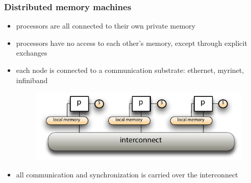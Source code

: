 \begin{frame}[fragile]
%
  \frametitle{Distributed memory machines}
%
  \begin{itemize}
%
  \item processors are all connected to their own private memory
  \item processors have no access to each other's memory, except through explicit exchanges
  \item each node is connected to a communication substrate: ethernet, myrinet, infiniband
%
  \begin{figure}
    \centering
    \includegraphics[width=.90\linewidth]{figures/distributed-memory.pdf}
    \label{fig:distributed-memory}
  \end{figure}
%
  \item all communication and synchronization is carried over the interconnect 
%
  \end{itemize}
%
\end{frame}

